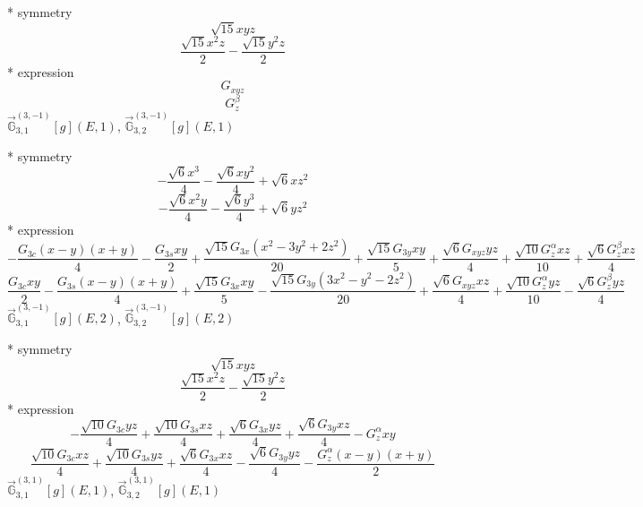 \documentclass[fleqn,8pt]{jsarticle}
\begin{document}
\noindent\quad ** symmetry
\begin{dmath*}
\sqrt{15} x y z
\end{dmath*}
\begin{dmath*}
\frac{\sqrt{15} x^{2} z}{2} - \frac{\sqrt{15} y^{2} z}{2}
\end{dmath*}
\noindent\quad ** expression
\begin{dmath*}
G_{xyz}
\end{dmath*}
\begin{dmath*}
G_{z}^{\beta}
\end{dmath*}
\noindent\quad $\vec{\mathbb{G}}_{3,1}^{(3,-1)}[g](E,1)$, $\vec{\mathbb{G}}_{3,2}^{(3,-1)}[g](E,1)$

\noindent\quad ** symmetry
\begin{dmath*}
- \frac{\sqrt{6} x^{3}}{4} - \frac{\sqrt{6} x y^{2}}{4} + \sqrt{6} x z^{2}
\end{dmath*}
\begin{dmath*}
- \frac{\sqrt{6} x^{2} y}{4} - \frac{\sqrt{6} y^{3}}{4} + \sqrt{6} y z^{2}
\end{dmath*}
\noindent\quad ** expression
\begin{dmath*}
- \frac{G_{3c} \left(x - y\right) \left(x + y\right)}{4} - \frac{G_{3s} x y}{2} + \frac{\sqrt{15} G_{3x} \left(x^{2} - 3 y^{2} + 2 z^{2}\right)}{20} + \frac{\sqrt{15} G_{3y} x y}{5} + \frac{\sqrt{6} G_{xyz} y z}{4} + \frac{\sqrt{10} G_{z}^{\alpha} x z}{10} + \frac{\sqrt{6} G_{z}^{\beta} x z}{4}
\end{dmath*}
\begin{dmath*}
\frac{G_{3c} x y}{2} - \frac{G_{3s} \left(x - y\right) \left(x + y\right)}{4} + \frac{\sqrt{15} G_{3x} x y}{5} - \frac{\sqrt{15} G_{3y} \left(3 x^{2} - y^{2} - 2 z^{2}\right)}{20} + \frac{\sqrt{6} G_{xyz} x z}{4} + \frac{\sqrt{10} G_{z}^{\alpha} y z}{10} - \frac{\sqrt{6} G_{z}^{\beta} y z}{4}
\end{dmath*}
\noindent\quad $\vec{\mathbb{G}}_{3,1}^{(3,-1)}[g](E,2)$, $\vec{\mathbb{G}}_{3,2}^{(3,-1)}[g](E,2)$

\noindent\quad ** symmetry
\begin{dmath*}
\sqrt{15} x y z
\end{dmath*}
\begin{dmath*}
\frac{\sqrt{15} x^{2} z}{2} - \frac{\sqrt{15} y^{2} z}{2}
\end{dmath*}
\noindent\quad ** expression
\begin{dmath*}
- \frac{\sqrt{10} G_{3c} y z}{4} + \frac{\sqrt{10} G_{3s} x z}{4} + \frac{\sqrt{6} G_{3x} y z}{4} + \frac{\sqrt{6} G_{3y} x z}{4} - G_{z}^{\alpha} x y
\end{dmath*}
\begin{dmath*}
\frac{\sqrt{10} G_{3c} x z}{4} + \frac{\sqrt{10} G_{3s} y z}{4} + \frac{\sqrt{6} G_{3x} x z}{4} - \frac{\sqrt{6} G_{3y} y z}{4} - \frac{G_{z}^{\alpha} \left(x - y\right) \left(x + y\right)}{2}
\end{dmath*}
\noindent\quad $\vec{\mathbb{G}}_{3,1}^{(3,1)}[g](E,1)$, $\vec{\mathbb{G}}_{3,2}^{(3,1)}[g](E,1)$
\end{document}
